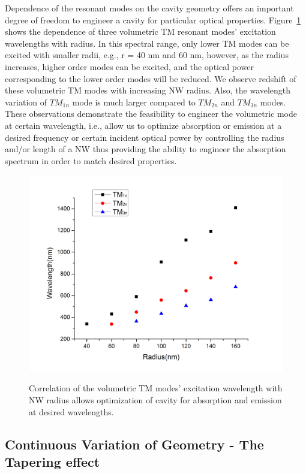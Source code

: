 Dependence of the resonant modes on the cavity geometry offers an important
degree of freedom to engineer a cavity for particular optical properties.
Figure~\ref{TMRadiusScat} shows the dependence of three volumetric TM resonant
modes’ excitation wavelengths with radius. In this spectral range, only lower
TM modes can be excited with smaller radii, e.g., r = 40 nm and 60 nm, however,
as the radius increases, higher order modes can be excited, and the optical
power corresponding to the lower order modes will be reduced. We observe
redshift of these volumetric TM modes with increasing NW radius. Also, the
wavelength variation of ${TM}_{1n}$ mode is much larger compared to ${TM}_{2n}$
and ${TM}_{3n}$ modes. These observations demonstrate the feasibility to
engineer the volumetric mode at certain wavelength, i.e., allow us to optimize
absorption or emission at a desired frequency or certain incident optical power
by controlling the radius and/or length of a NW thus providing the ability to
engineer the absorption spectrum in order to match desired properties.

\begin{figure}
  \caption{Correlation of the volumetric TM modes' excitation wavelength with NW radius allows optimization of cavity for absorption and emission at desired wavelengths.}
  \centering
  \includegraphics[width=\textwidth]{pictures/LM/TMRadiusScat}
  \label{TMRadiusScat}
\end{figure}

\subsection{Continuous Variation of Geometry - The Tapering effect}


